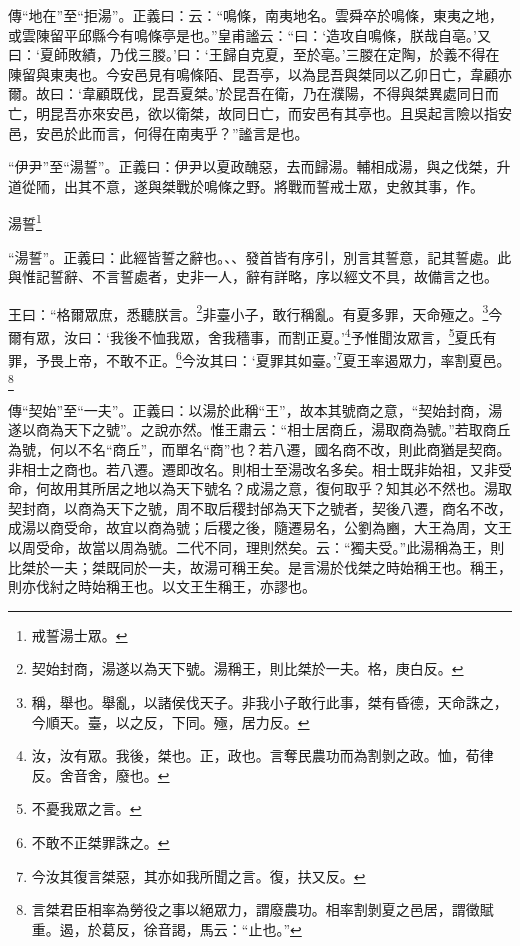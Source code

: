 {\noindent\zhuan{}\fzbyks 傳“地在”至“拒湯”。正義曰：云：“鳴條，南夷地名。雲舜卒於鳴條，東夷之地，或雲陳留平邱縣今有鳴條亭是也。”皇甫謐云：“曰：‘造攻自鳴條，朕哉自亳。’又曰：‘夏師敗績，乃伐三朡。’曰：‘王歸自克夏，至於亳。’三朡在定陶，於義不得在陳留與東夷也。今安邑見有鳴條陌、昆吾亭，以為昆吾與桀同以乙卯日亡，韋顧亦爾。故曰：‘韋顧既伐，昆吾夏桀。’於昆吾在衛，乃在濮陽，不得與桀異處同日而亡，明昆吾亦來安邑，欲以衛桀，故同日亡，而安邑有其亭也。且吳起言險以指安邑，安邑於此而言，何得在南夷乎？”謐言是也。 \par}

{\noindent\shu{}\fzkt “伊尹”至“湯誓”。正義曰：伊尹以夏政醜惡，去而歸湯。輔相成湯，與之伐桀，升道從陑，出其不意，遂與桀戰於鳴條之野。將戰而誓戒士眾，史敘其事，作。 \par}

湯誓\footnote{戒誓湯士眾。}

{\noindent\shu{}\fzkt “湯誓”。正義曰：此經皆誓之辭也。、、發首皆有序引，別言其誓意，記其誓處。此與惟記誓辭、不言誓處者，史非一人，辭有詳略，序以經文不具，故備言之也。 \par}

王曰：“格爾眾庶，悉聽朕言。\footnote{契始封商，湯遂以為天下號。湯稱王，則比桀於一夫。格，庚白反。}非臺小子，敢行稱亂。有夏多罪，天命殛之。\footnote{稱，舉也。舉亂，以諸侯伐天子。非我小子敢行此事，桀有昏德，天命誅之，今順天。臺，以之反，下同。殛，居力反。}今爾有眾，汝曰：‘我後不恤我眾，舍我穡事，而割正夏。’\footnote{汝，汝有眾。我後，桀也。正，政也。言奪民農功而為割剝之政。恤，荀律反。舍音舍，廢也。}予惟聞汝眾言，\footnote{不憂我眾之言。}夏氏有罪，予畏上帝，不敢不正。\footnote{不敢不正桀罪誅之。}今汝其曰：‘夏罪其如臺。’\footnote{今汝其復言桀惡，其亦如我所聞之言。復，扶又反。}夏王率遏眾力，率割夏邑。\footnote{言桀君臣相率為勞役之事以絕眾力，謂廢農功。相率割剝夏之邑居，謂徵賦重。遏，於葛反，徐音謁，馬云：“止也。”}


{\noindent\zhuan{}\fzbyks 傳“契始”至“一夫”。正義曰：以湯於此稱“王”，故本其號商之意，“契始封商，湯遂以商為天下之號”。之說亦然。惟王肅云：“相士居商丘，湯取商為號。”若取商丘為號，何以不名“商丘”，而單名“商”也？若八遷，國名商不改，則此商猶是契商。非相士之商也。若八遷。遷即改名。則相士至湯改名多矣。相士既非始祖，又非受命，何故用其所居之地以為天下號名？成湯之意，復何取乎？知其必不然也。湯取契封商，以商為天下之號，周不取后稷封邰為天下之號者，契後八遷，商名不改，成湯以商受命，故宜以商為號；后稷之後，隨遷易名，公劉為豳，大王為周，文王以周受命，故當以周為號。二代不同，理則然矣。云：“獨夫受。”此湯稱為王，則比桀於一夫；桀既同於一夫，故湯可稱王矣。是言湯於伐桀之時始稱王也。稱王，則亦伐紂之時始稱王也。以文王生稱王，亦謬也。 \par}

